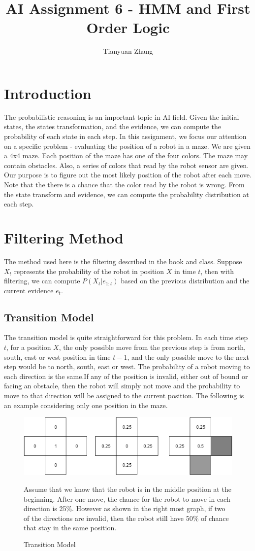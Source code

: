 \documentclass{article}
\title{AI Assignment 6 - HMM and First Order Logic}
\author{Tianyuan Zhang}
\begin{document}
\maketitle

\section{Introduction}
The probabilistic reasoning is an important topic in AI field. Given the initial states, the states transformation, and the evidence, we can compute the probability of each state in each step. In this assignment, we focus our attention on a specific problem - evaluating the position of a robot in a maze. We are given a 4x4 maze. Each position of the maze has one of the four colors. The maze may contain obstacles. Also, a series of colors that read by the robot sensor are given. Our purpose is to figure out the most likely position of the robot after each move. Note that the there is a chance that the color read by the robot is wrong. From the state transform and evidence, we can compute the probability distribution at each step.

\section{Filtering Method}
The method used here is the filtering described in the book and class. Suppose $X_t$ represents the probability of the robot in position $X$ in time $t$, then with filtering, we can compute $P(X_t|e_{1:t})$ based on the previous distribution and the current evidence $e_t$. 
\subsection{Transition Model}
The transition model is quite straightforward for this problem. In each time step $t$, for a position $X$, the only possible move from the previous step is from north, south, east or west position in time $t-1$, and the only possible move to the next step would be to north, south, east or west. The probability of a robot moving to each direction is the same.If any of the position is invalid, either out of bound or facing an obstacle, then the robot will simply not move and the probability to move to that direction will be assigned to the current position. The following is an example considering only one position in the maze. 
\begin{figure}[H]
\centering
\includegraphics[width=0.7\linewidth]{transition_model}
\caption{Transition Model}
\medskip
\small
Assume that we know that the robot is in the middle position at the beginning. After one move, the chance for the robot to move in each direction is 25\%. However as shown in the right most graph, if two of the directions are invalid, then the robot still have 50\% of chance that stay in the same position.
\end{figure}
\end{document}
